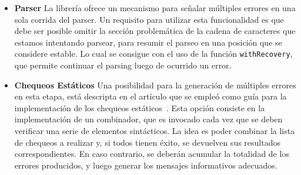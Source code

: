 \begin{itemize}

\item
\textbf{Parser}
La librería \Megaparsec{} ofrece un mecanismo para señalar múltiples errores en una sola corrida del parser.
Un requisito para utilizar esta funcionalidad es que debe ser posible omitir la sección problemática de la cadena de caracteres que estamos intentando parsear, para resumir el parseo en una posición que se considere estable.
Lo cual se consigue con el uso de la función \lstinline[style = haskell]{withRecovery}, que permite continuar el parsing luego de ocurrido un error.

\iffalse
Si quisiéramos aprovechar esta funcionalidad, deberíamos adaptar nuestro parser.
Debido que identificar cual puede ser un buen punto de recuperación es una tarea compleja, es necesario realizar algunas modificaciones al intérprete para poder facilitar la misma.
Un cambio conveniente posible, sería utilizar el punto y coma (\textbf{;}) para separar la secuencia de instrucciones del lenguaje.
De esta forma, al fallar el parser se podrían consumir \textit{tokens} hasta encontrar este delimitador, punto donde se puede recuperar y continuar el análisis normal del programa.
\fi

\item
\textbf{Chequeos Estáticos}
Una posibilidad para la generación de múltiples errores en esta etapa, está descripta en el artículo que se empleó como guía para la implementación de los chequeos estáticos~\cite{MonadicTC}.
Esta opción consiste en la implementación de un combinador, que es invocado cada vez que se deben verificar una serie de elementos sintácticos.
La idea es poder combinar la lista de chequeos a realizar y, si todos tienen éxito, se devuelven sus resultados correspondientes.
En caso contrario, se deberán acumular la totalidad de los errores producidos, y luego generar los mensajes informativos adecuados.

\iffalse
Esta técnica \textit{ad hoc}, resulta ser la más simple, y requiere pocas modificaciones del código actual.
De todas formas no aprovecha al máximo la estructura en la que se organiza un programa, y puede no ser trivial cuando se debe aplicar el combinador, y cuando no.
Lo cual se debe a que muchas veces la corrección semántica de cierta construcción, depende de la validez de los elementos previos a los que la misma hace referencia.
\fi


\end{itemize}
